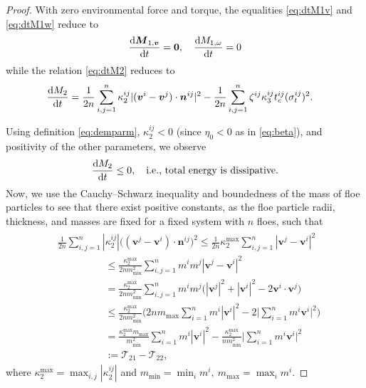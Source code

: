 \documentclass[a4paper,11pt]{article}
\numberwithin{equation}{section}
\theoremstyle{definition}
\newcommand{\bfzr}{\boldsymbol{0}}
\newcommand{\bfv}{\boldsymbol{v}}
\newcommand{\bfn}{\boldsymbol{n}}
\newcommand{\bfM}{\boldsymbol{M}}
\def\d{{  \rm d}}
\newcommand{\T}{\mathcal{T}}
\begin{document}
\begin{proof}
With zero environmental force and torque, the equalities \eqref{eq:dtM1v} and \eqref{eq:dtM1w} reduce to 
\begin{equation} \label{eq:dtM1vw0} 
\frac{\d \bfM_{1,\bfv}}{\d t} = \bfzr, 
\quad \frac{\d M_{1,\omega}}{\d t} = 0 
\end{equation}
while the relation \eqref{eq:dtM2} reduces to 
\begin{align*}
\begin{aligned} 
\frac{\d M_2}{\d t}  & =  \frac{1}{2n} \sum_{i, j=1}^n \kappa^{ij}_2 |(\bfv^i - \bfv^j )\cdot\bfn^{ij} |^2 - \frac{1}{2n}  \sum_{i, j=1}^n  \zeta^{ij} \kappa^{ij}_3 t_c^{ij} (\sigma^{ij}_t)^2.
\end{aligned}
\end{align*}

Using definition \eqref{eq:demparm}, $\kappa^{ij}_2 <0$ (since $\eta_0<0$ as in \eqref{eq:beta}), and positivity of the other parameters, we observe
\[
\frac{\d M_2}{\d t} \leq 0, \quad \mbox{i.e., total energy is dissipative.}
\]
Now, we use the Cauchy–Schwarz inequality and boundedness of the mass of floe particles to see that there exist positive constants, as the floe particle radii, thickness, and masses are fixed for a fixed system with $n$ floes, such that 
\begin{align}
\begin{aligned} \label{eq:dtM2v-inq}
&\frac{1}{2n} \sum_{i, j=1}^n |\kappa^{ij}_2|  \big( (\bfv^j  - \bfv^i )\cdot\bfn^{ij} \big)^2  \leq \frac{1}{2n}\kappa^{\max}_2  \sum_{i, j=1}^n |\bfv^j - \bfv^i |^2 \\
&\hspace{2cm} \leq \frac{\kappa^{\max}_2}{2n m^2_{\min}}  \sum_{i, j=1}^n m^im^j |\bfv^j - \bfv^i |^2 \\
&\hspace{2cm} =  \frac{\kappa^{\max}_2}{2n m^2_{\min}}  \sum_{i, j=1}^n m^im^j \Big( |\bfv^j |^2 + |\bfv^i |^2 - 2  \bfv^i \cdot \bfv^j \Big)  \\
&\hspace{2cm}\le  \frac{\kappa^{\max}_2}{2n  m^2_{\min}} \Big( 2n m_{\max} \sum_{i=1}^n m^i |\bfv^i |^2 - 2 \Big| \sum_{i=1}^n   m^i\bfv^i \Big|^2 \Big )  \\
&\hspace{2cm}= \frac{\kappa^{\max}_2 m_{\max}}{ m^2_{\min}} \sum_{i=1}^n m^i |\bfv^i |^2 -   \frac{\kappa^{\max}_2}{n m^2_{\min}}  \Big| \sum_{i=1}^n m^i  \bfv^i \Big|^2  \\
&\hspace{2cm} := \T_{21} - \T_{22},
\end{aligned}
\end{align}
where $\kappa^{\max}_2 = \max_{i,j}  |\kappa^{ij}_2|$ and $m_{\min} = \min_{i} m^i,\ m_{\max} = \max_{i} m^i.$


\end{proof}
\end{document}
